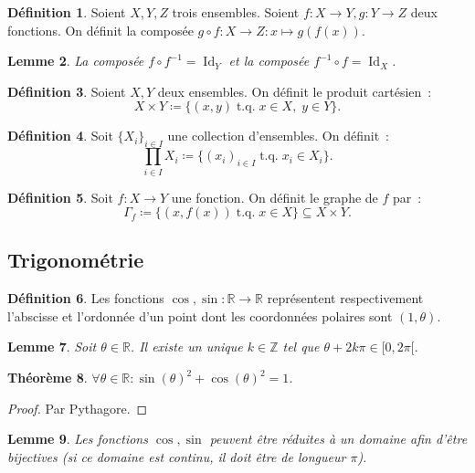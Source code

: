 \documentclass{article}
\DeclareMathOperator{\tq}{\text{ t.q. }}
\DeclareMathOperator{\Id}{Id}
\newcommand{\Z}{\mathbb Z}
\newcommand{\R}{\mathbb R}
\newtheorem{thm}{Théorème}[section]
\newtheorem{lem}[thm]{Lemme}
\theoremstyle{definition}
\newtheorem{déf}[thm]{Définition}
\theoremstyle{remark}
\begin{document}
		\begin{déf} Soient $X, Y, Z$ trois ensembles. Soient $f : X \to Y, g : Y \to Z$ deux fonctions. On définit la composée $g \circ f : X \to Z : x \mapsto g(f(x))$.
		\end{déf}

		\begin{lem} La composée $f \circ f^{-1} = \Id_Y$ et la composée $f^{-1} \circ f = \Id_X$. \end{lem}

		\begin{déf} Soient $X, Y$ deux ensembles. On définit le produit cartésien~: \[X \times Y \coloneqq \{(x, y) \tq x \in X,\;y\in Y\}.\] \end{déf}

		\begin{déf} Soit $\{X_i\}_{i \in I}$ une collection d'ensembles. On définit~: \[\prod_{i \in I} X_i \coloneqq \{(x_i)_{i \in I} \tq x_i \in X_i\}.\] \end{déf}

		\begin{déf} Soit $f : X \to Y$ une fonction. On définit le graphe de $f$ par~: \[\Gamma_f \coloneqq \{(x, f(x)) \tq x \in X\} \subseteq X \times Y.\] \end{déf}

	\subsection{Trigonométrie}
		\begin{déf} Les fonctions $\cos, \sin : \R \to \R$ représentent respectivement l'abscisse et l'ordonnée d'un point dont les coordonnées polaires sont
		$(1, \theta)$. \end{déf}

		\begin{lem} Soit $\theta \in \R$. Il existe un unique $k \in \Z$ tel que $\theta + 2k\pi \in [0, 2\pi[.$\end{lem}

		\begin{thm} $\forall \theta \in \R : \sin(\theta)^2 + \cos(\theta)^2 = 1$. \end{thm}

		\begin{proof} Par Pythagore. \end{proof}

		\begin{lem} Les fonctions $\cos, \sin$ peuvent être réduites à un domaine afin d'être bijectives (si ce domaine est continu, il doit être de longueur $\pi$).
		\end{lem}
\end{document}
